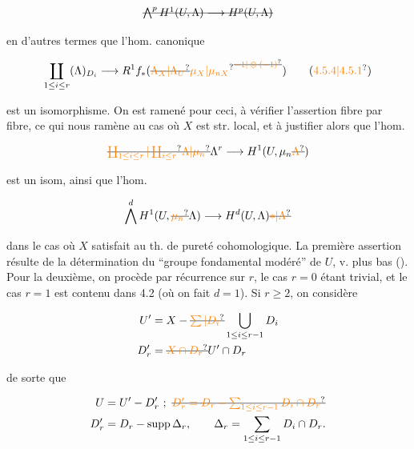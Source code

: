 \[
\deleted{\bigwedge^p H^1(U,\Lambda)\longrightarrow H^p(U,\Lambda)}
\]


en d'autres termes que l'hom. canonique

\[
\coprod_{1\leq i\leq r}(\Lambda)_{D_i}\longrightarrow R^1f_*(\deleted{\unsure{\Lambda_X|\Lambda_U}}\unsure{\mu_X|\mu_{nX}}^{\deleted{\unsure{-1|\otimes(-1)}}})
\tag*{(\unsure{4.5.4|4.5.1})}
\]

est un isomorphisme. On  est ramené pour ceci,   à vérifier l'assertion fibre par fibre, ce qui nous ramène au cas où $X$ est str. local, et à justifier alors que l'hom. 

\[
\deleted{\unsure{\coprod_{1\leq i\leq r}|\coprod_{i\leq r}}\unsure{\Lambda|\mu_n}}\Lambda^r\longrightarrow H^1(U,\mu_n\deleted{\unsure{\Lambda}})
\]

est un isom, ainsi que l'hom.

\[
\bigwedge^d H^1(U,\deleted{\unsure{\mu_n}}\Lambda)\longrightarrow H^d(U,\Lambda)\deleted{\unsure{*|\Lambda}}
\]

dans le cas où $X$ satisfait au th. de pureté cohomologique.
La première assertion résulte  de la détermination du ``groupe fondamental modéré'' de $U$, v. plus bas (\quad). Pour la deuxième, on procède par récurrence sur $r$, le cas $r=0$ étant trivial, et le cas $r=1$   est contenu dans 4.2 (où on fait $d=1$).  Si $r\geq2$, on  considère

\[
\begin{aligned}
U'&=X-\deleted{\unsure{\sum|D_i}}\bigcup_{1\leq i\leq r-1}D_i\\
D'_r&=\deleted{\unsure{X\cap D_r}}U'\cap D_r
\end{aligned}
\]

de sorte que

\[
\begin{aligned}
U&=U'-D'_r\ ;\ \deleted{\unsure{D'_r=D_r-\sum_{1\leq i\leq r-1}D_i\cap D_r}}\\
D'_r&=D_r-\operatorname{supp}\Delta_r,\qquad \Delta_r=\sum_{1\leq i\leq r-1}D_i\cap D_r.
\end{aligned}
\]


